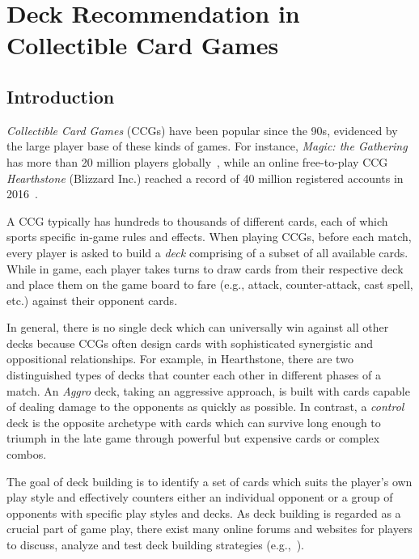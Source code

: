 \chapter{Deck Recommendation in Collectible Card Games} 

\label{chapter:qdeckrec} 


\section{Introduction}\label{sec:introduction}
\textit{Collectible Card Games} (CCGs) have been popular since the 90s, evidenced by the large player base of these kinds of games. For instance, \textit{Magic: the Gathering} has more than 20 million players globally~\cite{guinnessmagic}, while an online free-to-play CCG \textit{Hearthstone} (Blizzard Inc.) reached a record of 40 million registered accounts in 2016~\cite{hearthstonepopular}.  

A CCG typically has hundreds to thousands of different cards, each of which sports specific in-game rules and effects. When playing CCGs, before each match, every player is asked to build a \textit{deck} comprising of a subset of all available cards. While in game, each player takes turns to draw cards from their respective deck and place them on the game board to fare (e.g., attack, counter-attack, cast spell, etc.) against their opponent cards.

In general, there is no single deck which can universally win against all other decks because CCGs often design cards with sophisticated synergistic and oppositional relationships. For example, in Hearthstone, there are two distinguished types of decks that counter each other in different phases of a match. An \textit{Aggro} deck, taking an aggressive approach, is built with cards capable of dealing damage to the opponents as quickly as possible. In contrast, a \textit{control} deck is the opposite archetype with cards which can survive long enough to triumph in the late game through powerful but expensive cards or complex combos.

The goal of deck building is to identify a set of cards which suits the player's own play style and effectively counters either an individual opponent or a group of opponents with specific play styles and decks. As deck building is regarded as a crucial part of game play, there exist many online forums and websites for players to discuss, analyze and test deck building strategies (e.g.,~\cite{hearthpwn,icyveins}).  


